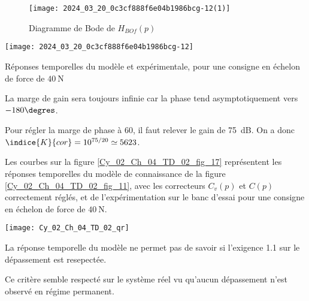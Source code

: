 \begin{figure}[!h]
\texttt{[image: 2024\_03\_20\_0c3cf888f6e04b1986bcg-12(1)]}
\caption{Diagramme de Bode de $H_{B O f}(p)$  \label{Cy_02_Ch_04_TD_02_fig_16}}
\end{figure}

\begin{marginfigure}%
\texttt{[image: 2024\_03\_20\_0c3cf888f6e04b1986bcg-12]}
\caption{Réponses temporelles du modèle et expérimentale, pour une consigne en échelon de force de $40 \mathrm{~N}$ \label{Cy_02_Ch_04_TD_02_fig_17}}
\end{marginfigure}
\fi

\ifprof
\begin{corrige}
La marge de gain sera toujours infinie car la phase tend asymptotiquement vers $-180\degres$.

Pour régler la marge de phase à 60\degres, il faut relever le gain de \SI{75}{dB}. On a donc $\indice{K}{cor}  =10^{75/20} \simeq  5623$.
\end{corrige}
\else
\fi



\ifprof
\else
Les courbes sur la figure \ref{Cy_02_Ch_04_TD_02_fig_17} représentent les réponses temporelles du modèle de connaissance de la figure \ref{Cy_02_Ch_04_TD_02_fig_11}, avec les correcteurs $C_{v}(p)$ et $C(p)$ correctement réglés, et de l'expérimentation sur le banc d'essai pour une consigne en échelon de force de $40 \mathrm{~N}$.
\fi


\ifprof
\else
\begin{marginfigure}
\centering
\texttt{[image: Cy\_02\_Ch\_04\_TD\_02\_qr]}
\end{marginfigure}
\fi


\ifprof
\begin{corrige}
La réponse temporelle du modèle ne permet pas de savoir si l'exigence 1.1 sur le dépassement est resepectée. 

Ce critère semble respecté sur le système réel vu qu'aucun dépassement n'est observé en régime permanent. 
\end{corrige}
\else
\fi

